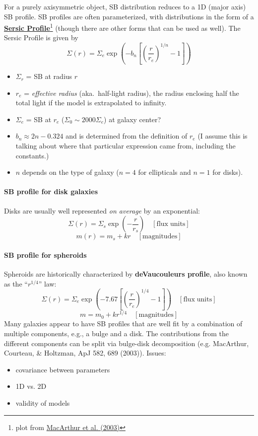 \documentclass{article}
\newcommand{\mynotes}[1]{\textcolor{cadmiumgreen}{#1}}
\begin{document}
For a purely axisymmetric object, SB distribution reduces to a 1D
(major axis) SB profile.
SB profiles are often parameterized, with distributions in the form
of a
\href{http://astronomy.nmsu.edu/holtz/a555/html/diagrams/a616/sersic.htm}
{\textbf{Sersic Profile}}\footnote{plot from
\href{http://adsabs.harvard.edu/abs/2003ApJ...582..689M}
{MacArthur et al. (2003)}}
(though there are other forms that can be used as well).
The Sersic Profile is given by
\[
    \Sigma(r) = \Sigma_{e}\exp \left( -b_{n} \left[ \left(
    \frac{r}{r_{e}} \right) ^{1/n}-1 \right] \right)
    \]
\begin{itemize}
    \item $\Sigma_{r}$ = SB at radius $r$
    \item $r_{e}$ = \textit{effective radius} (aka.\ half-light radius),
        the radius enclosing half the
        total light if the model is extrapolated to infinity.
    \item $\Sigma_{e}$ = SB at $r_{e}$
        ($\Sigma_{0} \sim 2000\Sigma_{e}$) \mynotes{at galaxy center?}
    \item $b_{n} \approx 2n - 0.324$ and is determined from the definition of
        $r_{e}$ \mynotes{(I assume this is talking about where that particular
        expression came from, including the constants.)}
    \item $n$ depends on the type of galaxy ($n=4$ for ellipticals and $n=1$
        for disks).
\end{itemize}

\paragraph{SB profile for disk galaxies}
Disks are usually well represented \emph{on average} by an exponential:
\[
    \Sigma(r) = \Sigma_{s}\exp\left(-\frac{r}{r_{s}}\right)
    \quad\mathrm{[flux\;units]}
    \]
\[
    m(r) = m_{s} + kr
    \quad \mathrm{[magnitudes]}
    \]

\paragraph{SB profile for spheroids}
Spheroids are historically characterized by
\textbf{deVaucouleurs profile}, also known as the ``$r^{1/4}$'' law:
\[
    \Sigma(r) = \Sigma_e\exp\left(-7.67\left[\left(
    \frac{r}{r_e}\right)^{1/4}-1\right] \right)
    \quad\mathrm{[flux\;units]}
    \]
\[
    m = m_{0} + kr^{1/4}
    \quad\mathrm{[magnitudes]}
    \]
Many galaxies appear to have SB profiles that are well fit by a combination of multiple
components, e.g., a bulge and a disk.
The contributions from the different components can be split
via bulge-disk decomposition (e.g.
MacArthur, Courteau, \& Holtzman, ApJ 582, 689 (2003)). Issues:
\begin{itemize}
    \item covariance between parameters
    \item 1D vs. 2D
    \item validity of models
\end{itemize}
\end{document}
